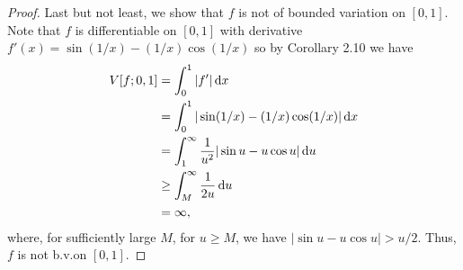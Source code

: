 \begin{proof}
  Last but not least, we show that $f$ is not of bounded variation on
  $[0,1]$. Note that $f$ is differentiable on $[0,1]$ with derivative
  $f'(x)=\sin(1/x)-(1/x)\cos(1/x)$ so by Corollary 2.10 we have
  \begin{equation}
    \label{eq:1:2}
    \begin{aligned}
      V[f;0,1]
      &=\int_0^1|f'|\mathop{}\!\mathrm{d} x\\
      &=\int_0^1|\sin(1/x)-(1/x)\cos(1/x)|\mathop{}\!\mathrm{d} x\\
      &=\int_1^\infty\frac{1}{u^2}|\sin u-u\cos u|\mathop{}\!\mathrm{d} u\\
      &\geq\int_M^\infty\frac{1}{2u}\mathop{}\!\mathrm{d} u\\
      &=\infty,
    \end{aligned}
  \end{equation}
  where, for sufficiently large $M$, for $u\geq M$, we have $|\sin u-u\cos
  u|>u/2$. Thus, $f$ is not b.v.\@ on $[0,1]$.
\end{proof}

